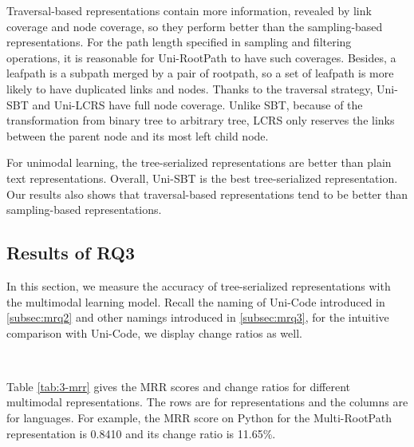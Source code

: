\documentclass[conference]{IEEEtran}
\begin{document}
Traversal-based representations contain more information, revealed by link coverage and node coverage, so they perform better than the sampling-based representations. For the path length specified in sampling and filtering operations, it is reasonable for Uni-RootPath to have such coverages. Besides, a leafpath is a subpath merged by a pair of rootpath, so a set of leafpath is more likely to have duplicated links and nodes. Thanks to the traversal strategy, Uni-SBT and Uni-LCRS have full node coverage. Unlike SBT, because of the transformation from binary tree to arbitrary tree, LCRS only reserves the links between the parent node and its most left child node.



\begin{tcolorbox}[fonttitle=\bfseries,title={Answer to Research Question 2}]
  \textbf{\rqbbb}
  \tcblower
  For unimodal learning, the tree-serialized representations are better than plain text representations. Overall, Uni-SBT is the best tree-serialized representation.
  Our results also shows that traversal-based representations tend to be better than sampling-based representations.
\end{tcolorbox}

\subsection{Results of RQ3}

In this section, we measure the accuracy of tree-serialized representations with the multimodal learning model. Recall the naming of Uni-Code introduced in \autoref{subsec:mrq2} and other namings introduced in \autoref{subsec:mrq3}, for the intuitive comparison with Uni-Code, we display change ratios as well.

\begin{table}[thb]
\centering
\caption{MRR Scores of Multimodal Representations}
~\\
\label{tab:3-mrr}
\end{table}
 Table \ref{tab:3-mrr} gives the MRR scores and change ratios for different multimodal representations. The rows are for representations and the columns are for languages. For example, the MRR score on Python for the Multi-RootPath representation is 0.8410 and its change ratio is 11.65\%.
\end{document}

